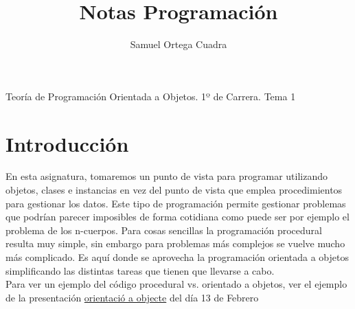 \documentclass[11pt]{article}
\title{Notas Programación}
\author{Samuel Ortega Cuadra}
\theoremstyle{plain}
\begin{document}
    \begin{center}
        \huge{Teoría de Programación Orientada a Objetos. 1º de Carrera. Tema 1}
    \end{center}
    \tableofcontents
    \newpage
    \section{Introducción} %
    \label{sec:introducción}
        En esta asignatura, tomaremos un punto de vista para programar utilizando objetos, clases e instancias en vez del punto de vista que emplea procedimientos para gestionar los datos. Este tipo de programación permite gestionar problemas que podrían parecer imposibles de forma cotidiana como puede ser por ejemplo el problema de los n-cuerpos. Para cosas sencillas la programación procedural resulta muy simple, sin embargo para problemas más complejos se vuelve mucho más complicado. Es aquí donde se aprovecha la programación orientada a objetos simplificando las distintas tareas que tienen que llevarse a cabo.\\

        Para ver un ejemplo del código procedural vs. orientado a objetos, ver el ejemplo de la presentación \href{https://e-aules.uab.cat/2022-23/pluginfile.php/644137/course/section/76903/object_orientation.pdf?time=1675980795699}{orientació a objecte} del día 13 de Febrero
\end{document}
